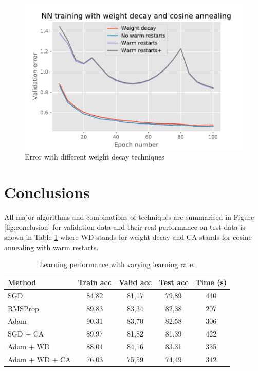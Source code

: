\documentclass{article}
\begin{document}
\begin{figure}[tb]
\vskip 5mm
\begin{center}
\centerline{\includegraphics[width=\columnwidth]{ex4_wd_cos_anneal.pdf}}
\caption{Error with different weight decay techniques}
\label{fig:ex4_wd_cos_anneal}
\end{center}
\vskip -5mm
\end{figure}

\section{Conclusions}
\label{sec:concl}
All major algorithms and combinations of techniques are summarised in Figure \ref{fig:conclusion} for validation data and their real performance on test data is shown in Table \ref{tab:conclusions} where WD stands for weight decay and CA stands for cosine annealing with warm restarts.

\begin{table}[tb]
\begin{center}
\begin{small}
\begin{sc}
\begin{tabular}{lcccc}
\hline
\abovespace\belowspace
Method & Train acc & Valid acc & Test acc & Time (s) \\
\hline
\abovespace
SGD                     & 84,82 & 81,17 & 79,89 & 440 \\
RMSProp                 & 89,83 & 83,34 & 82,38 & 207 \\
Adam                    & 90,31 & 83,70 & 82,58 & 306 \\
SGD + CA                & 89,97 & 81,82 & 81,39 & 422 \\
Adam + WD               & 88,04 & 84,16 & 83,31 & 335 \\
Adam + WD + CA          & 76,03 & 75,59 & 74,49 & 342 \\
\hline
\end{tabular}
\end{sc}
\end{small}
\caption{Learning performance with varying learning rate.}
\label{tab:conclusions}
\end{center}
\end{table}
\end{document}
